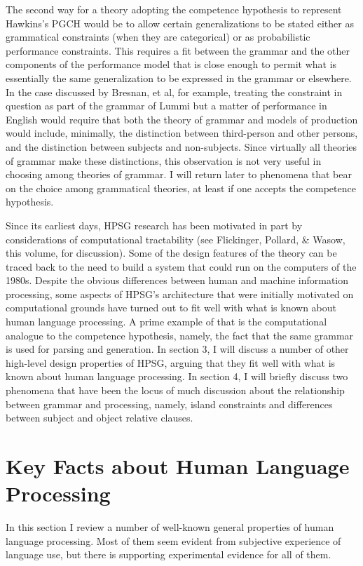 \documentclass[a4paper]{article}
\begin{document}
The second way for a theory adopting the competence hypothesis to represent Hawkins's PGCH would be to allow certain generalizations to be stated either as grammatical constraints (when they are categorical) or as probabilistic performance constraints.  This requires a fit between the grammar and the other components of the performance model that is close enough to permit what is essentially the same generalization to be expressed in the grammar or elsewhere.  In the case discussed by Bresnan, et al, for example, treating the constraint in question as part of the grammar of Lummi but a matter of performance in English would require that both the theory of grammar and models of production would include, minimally, the distinction between third-person and other persons, and the distinction between subjects and non-subjects.  Since virtually all theories of grammar make these distinctions, this observation is not very useful in choosing among theories of grammar.  I will return later to phenomena that bear on the choice among grammatical theories, at least if one accepts the competence hypothesis.

Since its earliest days, HPSG research has been motivated in part by considerations of computational tractability (see Flickinger, Pollard, \& Wasow, this volume, for discussion).  Some of the design features of the theory can be traced back to the need to build a system that could run on the computers of the 1980s.  Despite the obvious differences between human and machine information processing, some aspects of HPSG's architecture that were initially motivated on computational grounds have turned out to fit well with what is known about human language processing.  A prime example of that is the computational analogue to the competence hypothesis, namely, the fact that the same grammar is used for parsing and generation. In section 3, I will discuss a number of other high-level design properties of HPSG, arguing that they fit well with what is known about human language processing.  In section 4, I will briefly discuss two phenomena that have been the locus of much discussion about the relationship between grammar and processing, namely, island constraints and differences between subject and object relative clauses.

\section{Key Facts about Human Language Processing}

In this section I review a number of well-known general properties of human language processing.  Most of them seem evident from subjective experience of language use, but there is supporting experimental evidence for all of them.  
\end{document}

